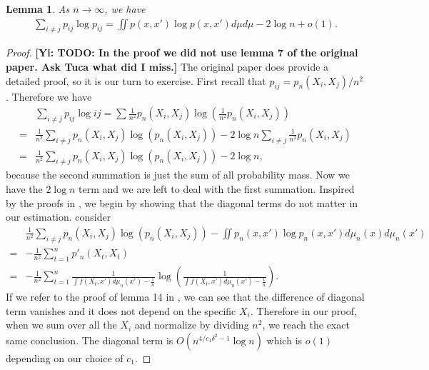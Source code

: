 \documentclass[10pt]{article}
\newcommand{\gy}[1]{\textbf{\color{red}[Yi: #1]}}
\newtheorem{lemma}{\bf Lemma}
\newenvironment{Proof of lemma}{\noindent{\bf Proof of Lemma}}{\hfill$\Box$\newline}
\newenvironment{Proof of claim}{\noindent{\bf Proof of claim}}{\hfill$\Box$\newline}
\newenvironment{Proof of theorem}{\noindent{\bf Proof of Theorem}}{\hfill\scriptsize{$\Box$}\newline}
\newenvironment{Proof of theorems}{\noindent{\bf Proof of Theorems}}{\hfill$\Box$\newline}
\newenvironment{Proof of proposition}{\noindent{\bf Proof of Proposition}}{\hfill$\Box$\newline}
\newenvironment{Proof of propositions}{\noindent{\bf Proof of Propositions}}{\hfill$\Box$\newline}
\newenvironment{Proof of exercise}{\noindent{\it Proof of Exercise:}}{\hfill$\Box$}
\numberwithin{equation}{section}
\begin{document}
\begin{lemma} \label{entropy_lemma_1}
    As $n \to \infty$, we have
    \begin{align}
        \sum_{i \neq j} p_{ij} \log p_{ij} = \iint p(x,x')\log p(x,x')d\mu d\mu - 2 \log n + o(1).
    \end{align}
\end{lemma}
\begin{proof}
    \gy{TODO: In the proof we did not use lemma 7 of the original paper. Ask Tuca what did I miss.}
    The original paper does provide a detailed proof, so it is our turn to exercise. First recall that $p_{ij} = p_n(X_i,X_j)/n^2$. Therefore we have
    \begin{align}
          & \sum_{i \neq j}p_{ij} \log{ij} = \sum \frac{1}{n^2}p_n(X_i,X_j)\log\left(\frac{1}{n^2}p_n(X_i,X_j)\right) \nonumber           \\
        = & \frac{1}{n^2} \sum_{i \neq j} p_n(X_i,X_j) \log (p_n(X_i,X_j)) - 2 \log n\sum_{i \neq j} \frac{1}{n^2} p_n(X_i,X_j) \nonumber \\
        = & \frac{1}{n^2} \sum_{i \neq j} p_n(X_i,X_j) \log (p_n(X_i,X_j)) - 2 \log n,
    \end{align}
    because the second summation is just the sum of all probability mass. Now we have the $2 \log n$ term and we are left to deal with the first summation. Inspired by the proofs in \cite{auffinger-tsne}, we begin by showing that the diagonal terms do not matter in our estimation. consider
    \begin{align}
          & \frac{1}{n^2} \sum_{i \neq j} p_n(X_i,X_j) \log (p_n(X_i,X_j)) - \iint p_n(x,x')\log p_n(x,x') d\mu_n(x)d\mu_n(x') \nonumber                     \\
        = & - \frac{1}{n^2}\sum_{t=1}^{n}p'_n(X_t,X_t) \nonumber                                                                                             \\
        = & - \frac{1}{n^2}\sum_{t=1}^{n} \frac{1}{\int f(X_t,x')d\mu_n(x') - \frac{1}{n}}\log\left(\frac{1}{\int f(X_t,x')d\mu_n(x') - \frac{1}{n}}\right).
    \end{align}
    If we refer to the proof of lemma 14 in \cite{auffinger-tsne}, we can see that the difference of diagonal term vanishes and it does not depend on the specific $X_i$. Therefore in our proof, when we sum over all the $X_i$ and normalize by dividing $n^2$, we reach the exact same conclusion. The diagonal term is $O(n^{4/c_1\delta^2 -1}\log n)$ which is $o(1)$ depending on our choice of $c_1$.


\end{proof}
\end{document}
